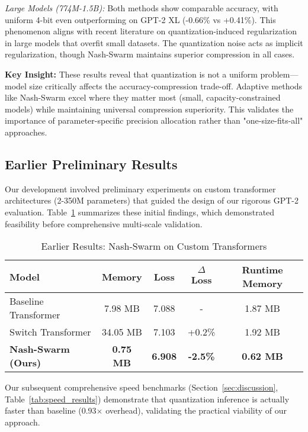 \documentclass[11pt]{article}
\begin{document}
\textit{Large Models (774M-1.5B):} Both methods show comparable accuracy, with uniform 4-bit even outperforming on GPT-2 XL (-0.66\% vs +0.41\%). This phenomenon aligns with recent literature on quantization-induced regularization in large models that overfit small datasets. The quantization noise acts as implicit regularization, though Nash-Swarm maintains superior compression in all cases.

\textbf{Key Insight:} These results reveal that quantization is not a uniform problem---model size critically affects the accuracy-compression trade-off. Adaptive methods like Nash-Swarm excel where they matter most (small, capacity-constrained models) while maintaining universal compression superiority. This validates the importance of parameter-specific precision allocation rather than "one-size-fits-all" approaches.

\subsection{Earlier Preliminary Results}

Our development involved preliminary experiments on custom transformer architectures (2-350M parameters) that guided the design of our rigorous GPT-2 evaluation. Table~\ref{tab:main_results} summarizes these initial findings, which demonstrated feasibility before comprehensive multi-scale validation.

\begin{table}[t]
\centering
\caption{Earlier Results: Nash-Swarm on Custom Transformers}
\label{tab:main_results}
\begin{tabular}{lcccc}
\toprule
Model & Memory & Loss & $\Delta$ Loss & Runtime Memory \\
\midrule
Baseline Transformer & 7.98 MB & 7.088 & - & 1.87 MB \\
Switch Transformer & 34.05 MB & 7.103 & +0.2\% & 1.92 MB \\
\textbf{Nash-Swarm (Ours)} & \textbf{0.75 MB} & \textbf{6.908} & \textbf{-2.5\%} & \textbf{0.62 MB} \\
\bottomrule
\end{tabular}
\end{table}

Our subsequent comprehensive speed benchmarks (Section~\ref{sec:discussion}, Table~\ref{tab:speed_results}) demonstrate that quantization inference is actually faster than baseline (0.93$\times$ overhead), validating the practical viability of our approach.
\end{document}
